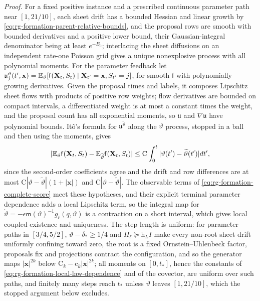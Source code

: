 \noindent\emph{Proof.}
For a fixed positive instance and a prescribed continuous parameter path near
\([1,21/10]\), each sheet drift has a bounded Hessian and linear growth by
\cref{eq:rg-formation-parent-relative-bounds}, and the proposal rows are
smooth with bounded derivatives and a positive lower bound, their
Gaussian-integral denominator being at least \(e^{-B_0}\); interlacing the
sheet diffusions on an independent rate-one Poisson grid gives a unique
nonexplosive process with all polynomial moments. For the parameter feedback
let \(\mathfrak u^\vartheta_j(t',\mathbf x)=\mathbb E_\vartheta[\mathsf f(\mathbf X_t,S_t)\mid
\mathbf X_{t'}=\mathbf x,S_{t'}=j]\), for smooth \(\mathsf f\) with polynomially
growing derivatives. Given the proposal times and labels, it composes
Lipschitz sheet flows with products of positive row weights; flow derivatives
are bounded on compact intervals, a differentiated weight is at most a
constant times the weight, and the proposal count has all exponential
moments, so \(\mathfrak u\) and \(\nabla\mathfrak u\) have polynomial bounds.
It\^o's formula for \(\mathfrak u^{\widetilde\vartheta}\) along the
\(\vartheta\) process, stopped in a ball and then using the moments, gives
\begin{equation}
 |\mathbb E_{\vartheta}\mathsf f(\mathbf X_t,S_t)
       -\mathbb E_{\widetilde\vartheta}\mathsf f(\mathbf X_t,S_t)|
 \le \mathrm C\int_0^t|\vartheta(t')-\widetilde\vartheta(t')| dt',
 \label{eq:rg-formation-local-law-dependence}
\end{equation}
since the second-order coefficients agree and the drift and row differences
are at most \(\mathrm C|\vartheta-\widetilde\vartheta|(1+|\mathbf x|)\) and
\(\mathrm C|\vartheta-\widetilde\vartheta|\). The observable terms of
\cref{eq:rg-formation-complete-score} meet these hypotheses, and their explicit
terminal parameter dependence adds a local Lipschitz term, so the integral map
for \(\dot\vartheta=-\epsilon\mathsf m(\vartheta)^{-1}g_\ell(q,\vartheta)\) is
a contraction on a short interval, which gives local coupled existence and
uniqueness. The step length is uniform: for parameter paths in
\([3/4,5/2]\), \(\vartheta-\delta_*\ge1/4\) and \(H_\ell\succeq\mathrm h_LI\)
make every non-root sheet drift uniformly confining toward zero, the root is a
fixed Ornstein--Uhlenbeck factor, proposals fix and projections contract the
configuration, and so the generator maps \(|\mathbf x|^{2k}\) below
\(\mathrm C_k-\mathrm c_k|\mathbf x|^{2k}\); all moments on \([0,t_*]\), hence
the constants of \cref{eq:rg-formation-local-law-dependence} and of the
covector, are uniform over such paths, and finitely many steps reach \(t_*\)
unless \(\vartheta\) leaves \([1,21/10]\), which the stopped argument below
excludes.

